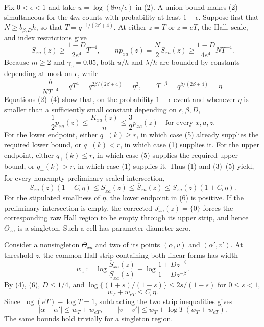 Fix \(0<\epsilon<1\) and take \(u=\log(8m/\epsilon)\) in (2).  A union bound makes (2) simultaneous for the \(4m\) counts with probability at least \(1-\epsilon\).  Suppose first that \(N\geq b_{\beta,D}h\), so that \(T=q^{-1/(2\beta+4)}\).  At either \(z=T\) or \(z=eT\), the Hall, scale, and index restrictions give
\[
 S_{xa}(z)\geq\frac{1-D}{2e^4}T^{-4},
 \qquad np_{xa}(z)=\frac N2S_{xa}(z)
 \geq\frac{1-D}{4e^4}NT^{-4}.
 \tag{3}
\]
Because \(m\geq2\) and \(\gamma_0=0.05\), both \(u/h\) and \(\lambda/h\) are bounded by constants depending at most on \(\epsilon\), while
\[
 \frac{h}{NT^{-4}}=qT^4
 =q^{2\beta/(2\beta+4)}=\eta^2,
 \qquad T^{-\beta}=q^{\beta/(2\beta+4)}=\eta.
 \tag{4}
\]
Equations (2)--(4) show that, on the probability-\(1-\epsilon\) event and whenever \(\eta\) is smaller than a sufficiently small constant depending on \(\epsilon,\beta,D\),
\[
 \frac12p_{xa}(z)\leq\frac{K_{xa}(z)}n\leq\frac32p_{xa}(z)
 \quad\text{for every }x,a,z.
 \tag{5}
\]
For the lower endpoint, either \(q_-(k)\geq r\), in which case (5) already supplies the required lower bound, or \(q_-(k)<r\), in which case (1) supplies it.  For the upper endpoint, either \(q_+(k)\leq r\), in which case (5) supplies the required upper bound, or \(q_+(k)>r\), in which case (1) supplies it.  Thus (1) and (3)--(5) yield, for every nonempty preliminary scaled intersection,
\[
 S_{xa}(z)(1-C_\epsilon\eta)
 \leq\underline S_{xa}(z)
 \leq\overline S_{xa}(z)
 \leq S_{xa}(z)(1+C_\epsilon\eta).
 \tag{6}
\]
For the stipulated smallness of \(\eta\), the lower endpoint in (6) is positive.  If the preliminary intersection is empty, the corrected \(J_{xa}(z)=\{0\}\) forces the corresponding raw Hall region to be empty through its upper strip, and hence \(\Theta_{xa}\) is a singleton.  Such a cell has parameter diameter zero.

Consider a nonsingleton \(\Theta_{xa}\) and two of its points \((\alpha,v)\) and \((\alpha',v')\).  At threshold \(z\), the common Hall strip containing both linear forms has width
\[
 w_z:=\log\frac{\overline S_{xa}(z)}{\underline S_{xa}(z)}
      +\log\frac{1+Dz^{-\beta}}{1-Dz^{-\beta}}.
\]
By (4), (6), \(D\leq1/4\), and
\(\log\{(1+s)/(1-s)\}\leq2s/(1-s)\) for \(0\leq s<1\),
\[
 w_T+w_{eT}\leq C_\epsilon\eta.
 \tag{7}
\]
Since \(\log(eT)-\log T=1\), subtracting the two strip inequalities gives
\[
 |\alpha-\alpha'|\leq w_T+w_{eT},
 \qquad
 |v-v'|\leq w_T+\log T\,(w_T+w_{eT}).
 \tag{8}
\]
The same bounds hold trivially for a singleton region.


